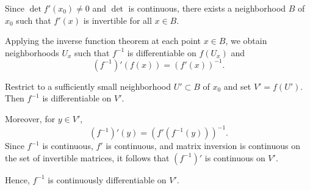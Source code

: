 \begin{remark}
Since $\det f'(x_0) \neq 0$ and $\det$ is continuous, there exists a neighborhood $B$ of $x_0$ such that $f'(x)$ is invertible for all $x \in B$.

Applying the inverse function theorem at each point $x \in B$, we obtain neighborhoods $U_x$ such that $f^{-1}$ is differentiable on $f(U_x)$ and
\[
(f^{-1})'(f(x)) = (f'(x))^{-1}.
\]

Restrict to a sufficiently small neighborhood $U' \subset B$ of $x_0$ and set $V' = f(U')$. Then $f^{-1}$ is differentiable on $V'$.

Moreover, for $y \in V'$,
\[
(f^{-1})'(y) = (f'(f^{-1}(y)))^{-1}.
\]
Since $f^{-1}$ is continuous, $f'$ is continuous, and matrix inversion is continuous on the set of invertible matrices, it follows that $(f^{-1})'$ is continuous on $V'$.

Hence, $f^{-1}$ is continuously differentiable on $V'$.
\end{remark}